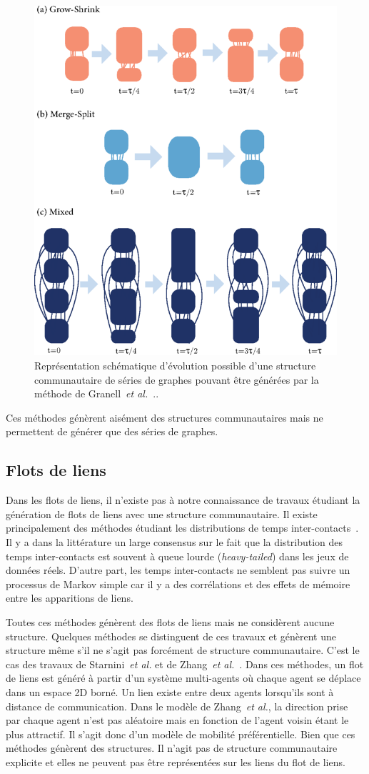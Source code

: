 \begin{figure}
\centering
\includegraphics[width=0.4\linewidth]{img/Qualite/Granell.png}
\caption{Représentation schématique d'évolution possible d'une structure communautaire de séries de graphes pouvant être générées par la méthode de Granell~\emph{et al.}~\cite{Granell2015a}.\protect\footnotemark.}
\label{fig:qualite_Grannell}
\end{figure}

Ces méthodes génèrent aisément des structures communautaires mais ne permettent de générer que des séries de graphes.

\subsection{Flots de liens}

Dans les flots de liens, il n'existe pas à notre connaissance de travaux étudiant la génération de flots de liens avec une structure communautaire.
Il existe principalement des méthodes étudiant les distributions de temps inter-contacts~\cite{Malmgren2008,Malmgren2009,Vestergaard2014}.
Il y a dans la littérature un large consensus sur le fait que la distribution des temps inter-contacts est souvent à queue lourde (\emph{heavy-tailed}) dans les jeux de données réels\cite{Karsai2011,Karsai2012a,Kivela2015}.
D'autre part, les temps inter-contacts ne semblent pas suivre un processus de Markov simple car il y a des corrélations et des effets de mémoire entre les apparitions de liens.

Toutes ces méthodes génèrent des flots de liens mais ne considèrent aucune structure.
Quelques méthodes se distinguent de ces travaux et génèrent une structure même s'il ne s'agit pas forcément de structure communautaire.
C'est le cas des travaux de Starnini~\emph{et al.}\cite{Starnini2013} et de Zhang~\emph{et al.}~\cite{Zhang2015a}.
Dans ces méthodes, un flot de liens est généré à partir d'un système multi-agents où chaque agent se déplace dans un espace 2D borné.
Un lien existe entre deux agents lorsqu'ils sont à distance de communication.
Dans le modèle de Zhang~\emph{et al.}, la direction prise par chaque agent n'est pas aléatoire mais en fonction de l'agent voisin étant le plus attractif.
Il s'agit donc d'un modèle de mobilité préférentielle.
Bien que ces méthodes génèrent des structures.
Il n'agit pas de structure communautaire explicite et elles ne peuvent pas être représentées sur les liens du flot de liens.



